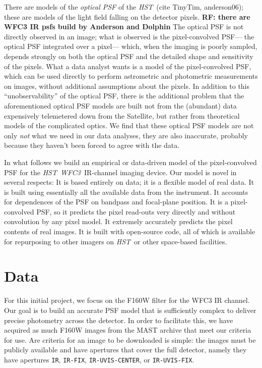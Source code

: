 \documentclass[12pt,letterpaper,preprint]{aastex}
\newcommand{\instrument}[1]{\textsl{#1}}
\newcommand{\rf}[1]{\textbf{RF: #1}}
\newcommand{\HST}{\instrument{HST}}
\newcommand{\WFC}{\instrument{WFC3}}
\begin{document}
There are models of the \emph{optical PSF} of the \HST\ (cite TinyTim, anderson06);
  these are models of the light field falling on the detector pixels. \rf{there are WFC3 IR psfs build by Anderson and Dolphin}
The optical PSF is not directly observed in an image;
  what is observed is the pixel-convolved PSF---%
  the optical PSF integrated over a pixel---%
  which, when the imaging is poorly sampled,
  depends strongly on both the optical PSF
  and the detailed shape and sensitivity of the pixels.
What a data analyst wants is a model of the pixel-convolved PSF,
  which can be used directly to perform astrometric and photometric measurements on images,
  without additional assumptions about the pixels.
In addition to this ``unobservability'' of the optical PSF,
  there is the additional problem that the aforementioned optical PSF models
  are built not from the (abundant) data expensively telemetered down from the Satellite,
  but rather from theoretical models of the complicated optics.
We find that these optical PSF models are not only \emph{not} what we need in our data analyses,
  they are also inaccurate, probably because they haven't been forced to agree with the data.

In what follows we build an empirical or data-driven model
  of the pixel-convolved PSF for the \HST\ \WFC\ IR-channel imaging device.
Our model is novel in several respects:
It is based entirely on data;
  it is a flexible model of real data.
It is built using essentially all the available data from the instrument.
It accounts for dependences of the PSF on bandpass and focal-plane position.
It is a pixel-convolved PSF,
  so it predicts the pixel read-outs very directly and without convolution by any pixel model.
It extremely accurately predicts the pixel contents of real images.
It is built with open-source code,
  all of which is available for repurposing to other imagers on \HST\ or other space-based facilities.

\section{Data}

For this initial project, we focus on the F160W filter for the WFC3 IR channel.  Our goal is to build 
an accurate PSF model that is sufficiently complex to deliver precise photometry across the 
detector.  In order to facilitate this, we have acquired as much F160W images from the MAST 
archive that meet our criteria for use.  Are criteria for an image to be downloaded is simple: the 
images must be publicly available and have apertures that cover the full detector, namely they 
have apertures \texttt{IR}, \texttt{IR-FIX}, \texttt{IR-UVIS-CENTER}, or \texttt{IR-UVIS-FIX}.
\end{document}
